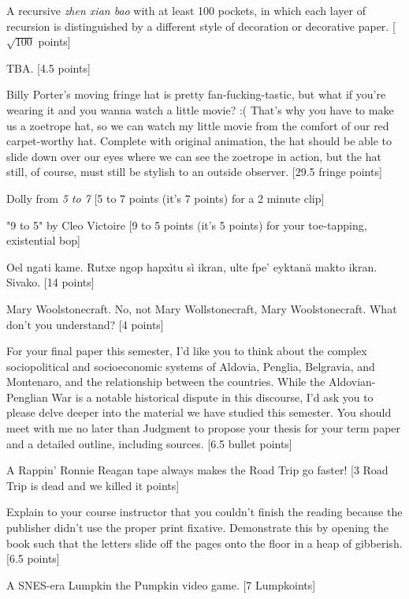 \documentclass{book}
\begin{document}
\begin{list}{}{}
\item A recursive \textit{zhen xian bao} with at least 100 pockets, in which each layer of recursion is distinguished by a different style of decoration or decorative paper. [$\sqrt{100}$ points]
\newpage
\item TBA. [4.5 points] %
\item Billy Porter’s moving fringe hat is pretty fan-fucking-tastic, but what if you’re wearing it and you wanna watch a little movie? :( That’s why you have to make us a zoetrope hat, so we can watch my little movie from the comfort of our red carpet-worthy hat. Complete with original animation, the hat should be able to slide down over our eyes where we can see the zoetrope in action, but the hat still, of course, must still be stylish to an outside observer. [29.5 fringe points]
\item Dolly from \textit{5 to 7} [5 to 7 points (it's 7 points) for a 2 minute clip] \textleaf
\item "9 to 5" by Cleo Victoire [9 to 5 points (it's 5 points) for your toe-tapping, existential bop]
\item Oel ngati kame. Rutxe ngop hapxìtu sì ikran, ulte fpe’ eyktanä makto ikran. Sivako. [14 points]
\item Mary Woolstonecraft. No, not Mary Wollstonecraft, Mary Woolstonecraft. What don’t you understand? [4 points]
\item For your final paper this semester, I’d like you to think about the complex sociopolitical and socioeconomic systems of Aldovia, Penglia, Belgravia, and Montenaro, and the relationship between the countries. While the Aldovian-Penglian War is a notable historical dispute in this discourse, I’d ask you to please delve deeper into the material we have studied this semester. You should meet with me no later than Judgment to propose your thesis for your term paper and a detailed outline, including sources. [6.5 bullet points]
\item A Rappin’ Ronnie Reagan tape always makes the Road Trip go faster! [3 Road Trip is dead and we killed it points]
\item Explain to your course instructor that you couldn't finish the reading because the publisher didn't use the proper print fixative. Demonstrate this by opening the book such that the letters slide off the pages onto the floor in a heap of gibberish. [6.5 points]
\item A SNES-era Lumpkin the Pumpkin video game. [7 Lumpkoints]

\end{list}
\end{document}
